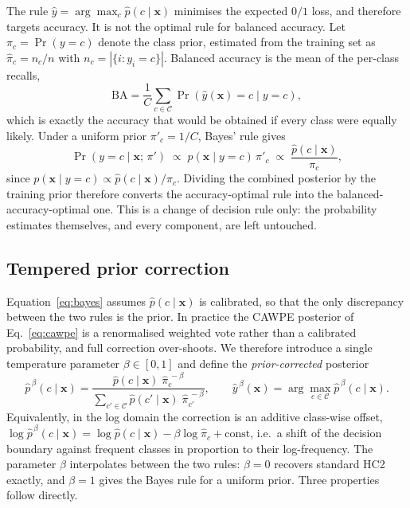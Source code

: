 The rule $\hat{y} = \arg\max_c \hat{p}(c \mid \mathbf{x})$ minimises the expected
$0/1$ loss, and therefore targets accuracy. It is not the optimal rule for balanced
accuracy. Let $\pi_c = \Pr(y=c)$ denote the class prior, estimated from the training set
as $\hat{\pi}_c = n_c / n$ with $n_c = |\{i : y_i = c\}|$. Balanced accuracy is the mean
of the per-class recalls,
\begin{equation}
  \mathrm{BA} = \frac{1}{C} \sum_{c \in \mathcal{C}}
    \Pr\!\left(\hat{y}(\mathbf{x}) = c \mid y = c\right),
  \label{eq:ba}
\end{equation}
which is exactly the accuracy that would be obtained if every class were equally likely.
Under a uniform prior $\pi'_c = 1/C$, Bayes' rule gives
\begin{equation}
  \Pr\!\left(y = c \mid \mathbf{x};\, \pi'\right)
  \;\propto\; p(\mathbf{x} \mid y = c) \, \pi'_c
  \;\propto\; \frac{\hat{p}(c \mid \mathbf{x})}{\pi_c},
  \label{eq:bayes}
\end{equation}
since $p(\mathbf{x}\mid y=c) \propto \hat{p}(c\mid\mathbf{x})/\pi_c$. Dividing the
combined posterior by the training prior therefore converts the accuracy-optimal rule
into the balanced-accuracy-optimal one. This is a change of decision rule only: the
probability estimates themselves, and every component, are left untouched.

\subsection{Tempered prior correction}

Equation~\eqref{eq:bayes} assumes $\hat{p}(c\mid\mathbf{x})$ is calibrated, so that the
only discrepancy between the two rules is the prior. In practice the CAWPE posterior of
Eq.~\eqref{eq:cawpe} is a renormalised weighted vote rather than a calibrated
probability, and full correction over-shoots. We therefore introduce a single
temperature parameter $\beta \in [0,1]$ and define the \emph{prior-corrected} posterior
\begin{equation}
  \boxed{\;
  \hat{p}^{\,\beta}(c \mid \mathbf{x})
  = \frac{\hat{p}(c \mid \mathbf{x}) \; \hat{\pi}_c^{\,-\beta}}
         {\sum_{c' \in \mathcal{C}} \hat{p}(c' \mid \mathbf{x}) \; \hat{\pi}_{c'}^{\,-\beta}},
  \qquad
  \hat{y}^{\,\beta}(\mathbf{x}) = \arg\max_{c \in \mathcal{C}} \hat{p}^{\,\beta}(c \mid \mathbf{x}).
  \;}
  \label{eq:tempered}
\end{equation}
Equivalently, in the log domain the correction is an additive class-wise offset,
$\log \hat{p}^{\,\beta}(c\mid\mathbf{x}) = \log \hat{p}(c\mid\mathbf{x}) - \beta \log
\hat{\pi}_c + \mathrm{const}$, i.e.\ a shift of the decision boundary against frequent
classes in proportion to their log-frequency. The parameter $\beta$ interpolates between
the two rules: $\beta=0$ recovers standard HC2 exactly, and $\beta=1$ gives the Bayes
rule for a uniform prior. Three properties follow directly.

